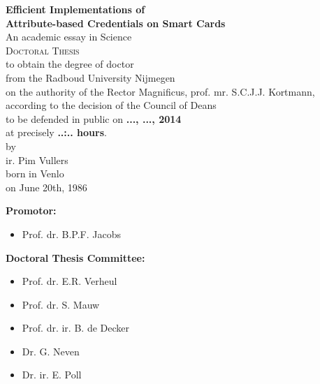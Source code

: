 \begin{center}
  \thispagestyle{empty}

  \textbf{\Large Efficient Implementations of\\ Attribute-based Credentials on Smart Cards}\\[15mm]

  An academic essay in Science \\[15mm]

  \textsc{Doctoral Thesis} \\[15mm]

  to obtain the degree of doctor \\
  from the Radboud University Nijmegen \\
  on the authority of the Rector Magnificus, prof. mr. S.C.J.J. Kortmann, \\
  according to the decision of the Council of Deans \\
  to be defended in public on \textbf{..., ..., 2014} \\
  at precisely \textbf{..:.. hours}. \\[30mm]

  by \\[30mm]

  ir. Pim Vullers \\[15mm]

  born in Venlo \\
  on June 20th, 1986
\end{center}

\clearpage

\thispagestyle{empty}

\textbf{Promotor:}
\begin{itemize}
  \item[~] Prof. dr. B.P.F. Jacobs
\end{itemize}

\textbf{Doctoral Thesis Committee:}
\begin{itemize}
  \item[~] Prof. dr. E.R. Verheul
  \item[~] Prof. dr. S. Mauw
  \item[~] Prof. dr. ir. B. de Decker
  \item[~] Dr. G. Neven
  \item[~] Dr. ir. E. Poll
\end{itemize}